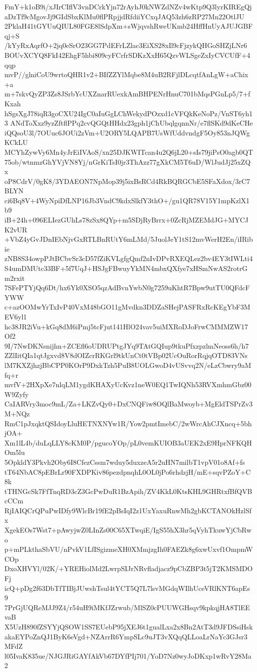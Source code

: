 FmY+k1oB9i/xJIrCIflV3vnDCrkYjn72rAyhJ0kNWZdNZv4wKtp9Q3lyrKIREgQj
aDzTf9cMgovJj9GIdSbxKlMu0flPRpjjdRfdiiYCxqJAQ53zh6zRP27Mn22OtlJU
2PklaH41tGYUuQIUL80FGE8lSdpXm+sWjqvshRweUKmb24HffHnUyAJUJGBFqj+S
/kYyRxAqrfO+2jq0eSrO23GG7PdEFrLZlac3EiXS28xIl9cFjzykQHGoSHZjLNr6
BOUvXCYQ8FkI42EhgF5hbi809cyFCrfrSDKzXxH65QzvWLSgeZxIyCVCUfF+4qqp
mvP//glniCoU9wrtoQHR1v2+BIfZZYlMqbe8M4uB2RFjlDLcqtfAnLgW+aChix+a
m+7skvQyZP3Zs8JSrbYcUXZnarRUexkAmBHPENrHnuC701bMqsPGnLp5/7+fKxah
hSgsXgJ78iqR3goCXU24IgC0aIuGgLChWekydPOzxd1cVFQkKeNoPz/VnST6yh13
ANdToXxz9yzZftflPPq2cvQGQtHHdx23gph1jChUbqlgqnnNr/e7flSKd9dKeCHe
iQQsoU3l/7OUuc6JOUi2zVm+U2ORY5LQAPB7UsWfUddvndgF5Oy853nJQWgKCkLU
MCYhZywVy6Mn4yJrEiIVAoS/xn25DJKWITcan4u2Q6jL20+sIs79jiPsO0agb0QT
75ob/wtnmzGhYVjVN8Yj/nGrKiTsI0jr3ThAzz77gXkCM5T6uD/WlJudJj25xZQx
oP8CdrV/0gK8/3YDAEON7NpMop39j5ixBsRCd4RkBQRGCbE5SFaXdox/3rC7BLYN
ci6Bq8V+4WyNpiDfLNP16Jb3VndC9kdxSlkfY3thO+/gu1QR78V15Y1mpKzlX1b9
iB+24h+096ELIezGUhLs78zSx8QYp+m5SDjRyBrrx+0ZcRjMZEMdJG+MYCJK2vUR
+VbZ4yGvJDnIEbNjvGxRTLBnRUtY6mLMd/5JuolJeY1tS12mvWerH2En/iIRibie
zNB8S34owpPJtBCbvSr3cD57fZiKVLgfgQmf2nIvDPvRXEQLez2bv4EY3tIWLti4
S4umDMUtc33BF+5f7UqJ+HSJgFBwuyYkMN4mbxQXfye7xHSmNwAS2rotrGm2rxit
7SFePTYjQq6Dt/hx6Yk0XSO5qzAdBvnYwbN0g7259uKhtR7Bpw9utTU0QFdcFYWW
c+azOOMwYrTxIvP40VxM48bGO11gMvdkn3DDZaSHejPASFRxRcKEgYbF3MEV6yl1
hc38JR2iVu+kGq8dM6iPmj5tcFjut141HlO24vav5uiMXRoDJoFrwCMMMZW17Of2
9I/7NwDKNsnijhn+ZCEfl6oUDRUPtgJYq9TAtGQIup9tkuPfxzpzlmNeoss6h/h7
ZZlIitQIa1qtJgxvd8V8dOIZcrRKGrl9tkUnCt0tVBp02UcOuRorRqjqOTD83VNs
lM7KXZjhzjBbCPP0KOrP9DxkTzh5PuB8UOLGwoD4vUSvvq2N/eLzCbwry9aMfq+r
mvfV+2HXpXe7nlqLM1ygdKHAXyUcKvz1neW0EQ1TwIQNh53RVXmhmGbz00W9Zyfy
CaIARVry3moc9mL/Za+LKZvQy0+DxCNQFiw8OQlBaMwoyb+MgEldTSPrZv3M+NQz
RmC1pJxqktQSIdoyLluHETNXNYw1R/Yow2pmtImebC/2wWrcAhCJXncq+5bhjOA+
Xm1lL4b/duLqLLY8cKM0P/pgucoYOp/pL0vemKUIOB3aUEK2xE9HprNFKQHOm5lu
5OpkldY3Pkvh2Oby6I8CfezCssm7wduy5duxzeA5r2uHN7milbT1vpV01o8Af+fs
tT64NbAC8pEBrLr90FXDPKiv86pezdpnqhL0OL0jPo6rhdzjH/mE+sqvPZoY+C8k
tTHNGcSk7FfTnqRD3cZ3GcPwDuR1BzApih/ZV4KkL0KtsKHL9GHRtxfBfQVBcCCm
RjIAIQCrQPuPwIDfy9WlcBr19fE2pBsIqI2z1UxYaxuRnwMh2gbKCTANOkHzlSfx
XgekEOs7Wst7+pAwyjwZ0LInZs00C65XTwqiE/IgS55hX3hr5qVyhTkuwYjCbRwo
p+mPLkthaSbVU/nPvkV1LfISgizmeXH0XMmjzgIh0FAEZk8g6xwUxvf1OmpmWCOp
DxoXHVYl/02K/+YREHiolMd2LwrpSIJrNRvfladjacz9pCbZBP3t5jT2KMSMDOFj
icQ+pDg2f63DbTfTIBjJUwshTsul4tYCT5Q7L7lsvMGdqWIlhUceVRlKNT6apEs9
7PrGjUQReMJJ9Z4/r54uH9iMKfJZrwub/MlSZ0cPUUWGHsqv9kpkqjHA8TlEEvaB
X5UzH890fZSYYjQSOW1SS7EUebP95jXEJ6t1gualLxa2x8Bn2AtT3d9JFDSsiHsk
akaEYPoZnQJ1ByK6eVgd+NZArrR6YmpSLc9uJT3vXQqQLLoaLrNaYc3GJsr3MFdZ
l05IvaK835ue/NJGJRiGAYfAkVb67DYfPIj701/YoD7Nz0wyJoDKxp1wRvY28Ma2
